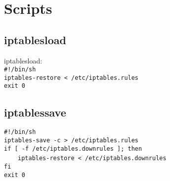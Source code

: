 \section{Scripts}
\subsection{iptablesload}
iptablesload:\\
\texttt{\#!/bin/sh}\\
\texttt{iptables-restore < /etc/iptables.rules}\\
\texttt{exit 0}\\

\subsection{iptablessave}
\texttt{\#!/bin/sh}\\
\texttt{iptables-save -c > /etc/iptables.rules}\\
\texttt{if [ -f /etc/iptables.downrules ]; then}\\
~~~~\texttt{iptables-restore < /etc/iptables.downrules}\\
\texttt{fi}\\
\texttt{exit 0}\\